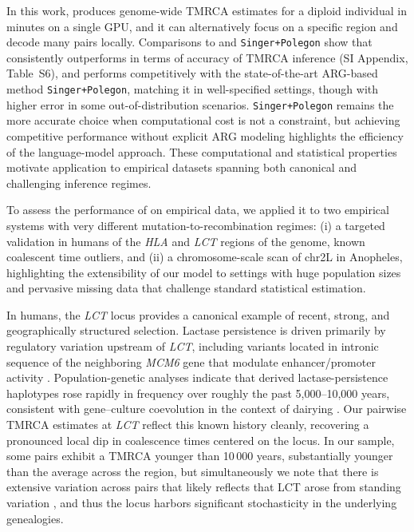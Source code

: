 \documentclass[9pt,twocolumn,twoside]{pnas-new}
\begin{document}
In this work, \cxtkit produces genome-wide TMRCA estimates for a diploid individual in minutes on a single GPU,
and it can alternatively focus on a specific region and decode many pairs locally.
Comparisons to \smcpp and \texttt{Singer+Polegon} show that \cxtkit
consistently outperforms \smcpp in terms of accuracy of TMRCA inference (SI Appendix, Table~S6), and performs competitively with the state-of-the-art
ARG-based method \texttt{Singer+Polegon}, matching it in well-specified settings,
though with higher error in some out-of-distribution scenarios.
\texttt{Singer+Polegon} remains the more accurate choice when computational cost is not a constraint,
but achieving competitive performance without explicit ARG modeling highlights the efficiency of the language-model approach.
These computational and statistical properties motivate application to empirical datasets spanning both canonical and challenging inference regimes.

To assess the performance of \cxtkit on empirical data, 
we applied it to two empirical systems with very different mutation-to-recombination regimes:
(i) a targeted validation in humans of the \emph{HLA} and \emph{LCT} regions of the genome, known coalescent time outliers,
and (ii) a chromosome-scale scan of chr2L in Anopheles, 
highlighting the extensibility of our model to settings with huge population sizes
and pervasive missing data that challenge standard statistical estimation.

In humans,
the \emph{LCT} locus provides a canonical example of recent, strong, and geographically structured selection.
Lactase persistence is driven primarily by regulatory variation upstream of \emph{LCT},
including variants located in intronic sequence of the neighboring \emph{MCM6} gene
that modulate enhancer/promoter activity \cite{swallow2003genetics,tishkoff2007convergent}.
Population-genetic analyses indicate that derived lactase-persistence haplotypes rose rapidly in frequency
over roughly the past 5{,}000--10{,}000 years,
consistent with gene--culture coevolution in the context of dairying \cite{bersaglieri2004genetic, itan2009origins}.
Our pairwise TMRCA estimates at \emph{LCT} reflect this known history cleanly,
recovering a pronounced local dip in coalescence times centered on the locus.
In our sample,
some pairs exhibit a TMRCA younger than 10\,000 years,
substantially younger than the average across the region, 
but simultaneously we note that there is extensive
variation across pairs that likely reflects that LCT arose from standing variation \cite{peter2012distinguishing},
and thus the locus harbors significant stochasticity in the underlying genealogies. 
\end{document}
